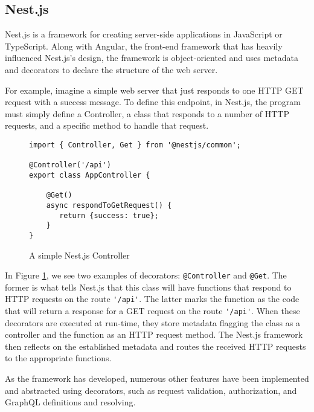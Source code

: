 \subsection{Nest.js} \label{sec:nest-js}
Nest.js is a framework for creating server-side applications in JavaScript or TypeScript.  Along with Angular, the front-end framework that has heavily influenced Nest.js's design, the framework is object-oriented and uses metadata and decorators to declare the structure of the web server.

For example, imagine a simple web server that just responds to one HTTP GET request with a success message.  To define this endpoint, in Nest.js, the program must simply define a Controller, a class that responds to a number of HTTP requests, and a specific method to handle that request.

\begin{figure}
    \begin{verbatim}
import { Controller, Get } from '@nestjs/common';

@Controller('/api')
export class AppController {

    @Get()
    async respondToGetRequest() {
       return {success: true};
    }
}
    \end{verbatim}
    \caption{A simple Nest.js Controller}
    \label{fig:nest-controller}
\end{figure}

In Figure \ref{fig:nest-controller}, we see two examples of decorators: \Verb!@Controller! and \Verb!@Get!.  The former is what tells Nest.js that this class will have functions that respond to HTTP requests on the route \Verb!'/api'!.  The latter marks the function as the code that will return a response for a GET request on the route \Verb!'/api'!.  When these decorators are executed at run-time, they store metadata flagging the class as a controller and the function as an HTTP request method.  The Nest.js framework then reflects on the established metadata and routes the received HTTP requests to the appropriate functions.

As the framework has developed, numerous other features have been implemented and abstracted using decorators, such as request validation, authorization, and GraphQL definitions and resolving.